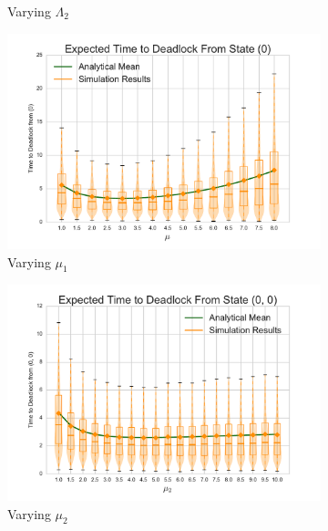 \documentclass{article}
\numberwithin{equation}{section}
\begin{document}
\begin{figure}[!htbp]
\begin{subfigure}[b]{0.333\textwidth}
    \caption{Varying $\Lambda_2$}
    \label{fig:2Nms_L2}
  \end{subfigure}
  \begin{subfigure}[b]{0.333\textwidth}
    \includegraphics[width=\textwidth]{images/varymu_1Nms}
    \caption{Varying $\mu_1$}
    \label{fig:2Nms_mu1}
  \end{subfigure}
  \begin{subfigure}[b]{0.333\textwidth}
    \includegraphics[width=\textwidth]{images/varymu2_2Nms}
    \caption{Varying $\mu_2$}
    \label{fig:2Nms_mu2}
  \end{subfigure}
  \begin{subfigure}[b]{0.333\textwidth}

\end{subfigure}
\end{figure}
\end{document}
